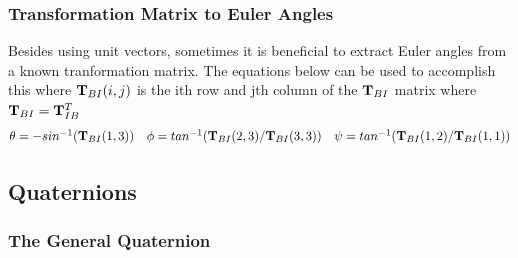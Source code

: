 \documentclass{article}
\begin{document}
\subsubsection{Transformation Matrix to Euler Angles}

Besides using unit vectors, sometimes it is beneficial to extract
Euler angles from a known tranformation matrix. The equations below
can be used to accomplish this where ${\bf T}_{BI}(i,j)$ is the ith row and
jth column of the ${\bf T}_{BI}$ matrix where ${\bf T}_{BI} = {\bf T}_{IB}^T$
\begin{equation}
  \begin{matrix}
  \theta = -sin^{-1}({\bf T}_{BI}(1,3)) & \phi =
  tan^{-1}({\bf T}_{BI}(2,3)/{\bf T}_{BI}(3,3)) & \psi =
  tan^{-1}({\bf T}_{BI}(1,2)/{\bf T}_{BI}(1,1)) \end{matrix}
\end{equation}

\subsection{Quaternions}\label{s:quat}

\subsubsection{The General Quaternion}
\end{document}
